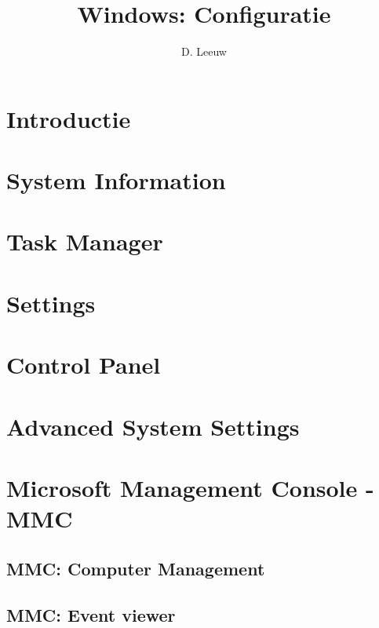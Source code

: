 \documentclass[a4paper,12pt,twoside,titlepage]{article}
\author{D. Leeuw}
\title{Windows: Configuratie}
\date{\today\\
0.0.0
\vfill
\raggedright
\copyright\ 2025 Dennis Leeuw\\
}
\begin{document}

\maketitle



\section{Introductie}


\section{System Information}


\section{Task Manager}


\section{Settings}


\section{Control Panel}


\section{Advanced System Settings}


\section{Microsoft Management Console - MMC}

\subsection{MMC: Computer Management}

\subsection{MMC: Event viewer}

\end{document}
